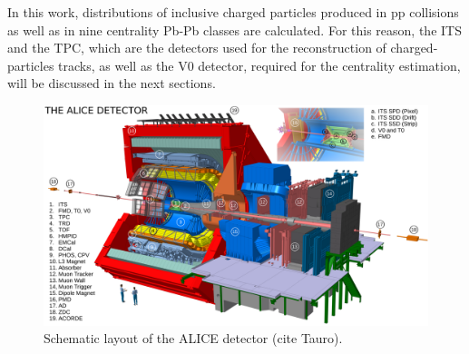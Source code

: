 \documentclass[12pt,a4paper]{report}
\begin{document}
In this work, \pt distributions of inclusive charged particles produced in pp collisions as well as in nine centrality Pb-Pb classes are calculated. For this reason, the ITS and the TPC, which are the detectors used for the reconstruction of charged-particles tracks, as well as the V0 detector, required for the centrality estimation, will be discussed in the next sections. 
\begin{figure}[tb!]
\centering
\includegraphics[width=15cm]{Plots/Alice.png}  
\caption{Schematic layout of the ALICE detector (cite Tauro).}
\label{ALICE}
\end{figure}
\end{document}
